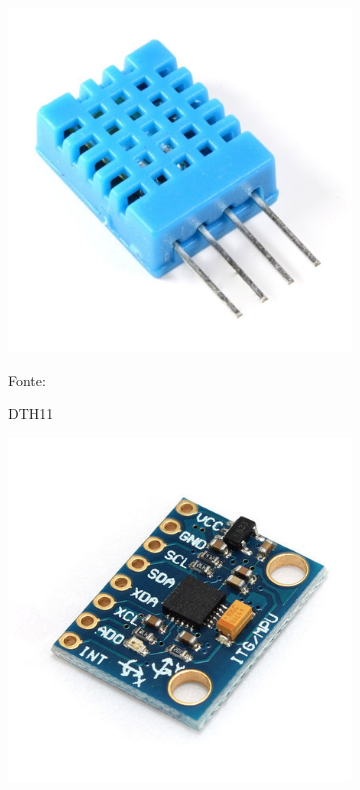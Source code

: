 \begin{figure}[h!]
\centering
  \begin{subfigure}[b]{0.3\textwidth}
  \centering
    \includegraphics[width=\textwidth]{figuras/dth11.jpg}
    \caption{DTH11} Fonte: \cite{FilipeFlop2019c}
    \label{fig:dth11}
  \end{subfigure}
  \begin{subfigure}[b]{0.3\textwidth}
  \centering
    \includegraphics[width=\textwidth]{figuras/mpu6050.jpg}

\end{subfigure}
\end{figure}
